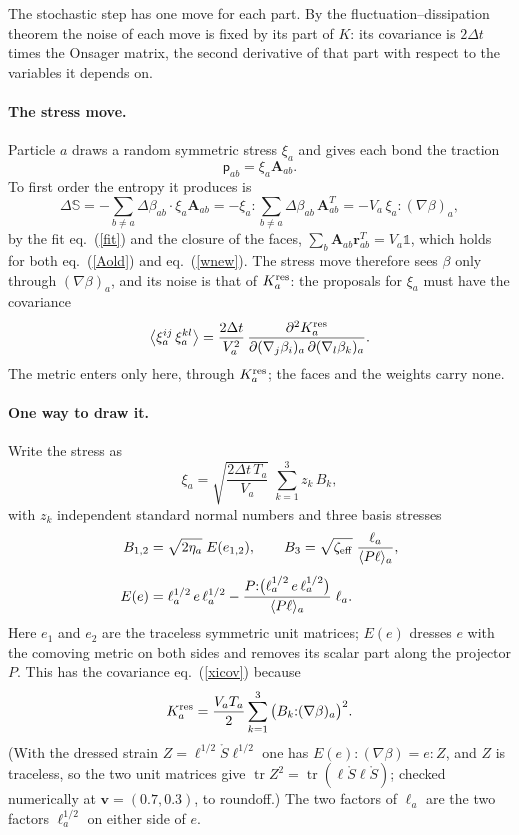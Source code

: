 \documentclass[11pt,aps,preprint,nofootinbib,superscriptaddress,tightenlines]{revtex4-2}
\newcommand{\one}{\mathds{1}}
\newcommand{\pf}{\bm{\mathsf p}}
\def\st{\begin{equation}}
\def\stp{\end{equation}}
\def\Eq#1{eq.~(\ref{#1})}
\def\tr{\operatorname{tr}}
\let\oldparagraph\paragraph
\renewcommand{\paragraph}{\par\bigskip\oldparagraph}
\begin{document}
The stochastic step has one move for each part.  By the fluctuation--dissipation theorem the noise of each move is fixed by its
part of $K$: its covariance is $2\Delta t$ times the Onsager matrix, the second derivative of that part with respect to the
variables it depends on.

\paragraph{The stress move.}  Particle $a$ draws a random symmetric stress $\xi_a$ and gives each bond the traction
\st
\pf_{ab}=\xi_a\bm A_{ab} .
\stp
To first order the entropy it produces is
\st
\Delta\mathbb S=-\sum_{b\neq a}\Delta\beta_{ab}\cdot\xi_a\bm A_{ab}
=-\xi_a{:}\sum_{b\neq a}\Delta\beta_{ab}\,\bm A_{ab}^T
=-V_a\,\xi_a{:}(\nabla\beta)_a ,
\label{dSstress}
\stp
by the fit \Eq{fit} and the closure of the faces, $\sum_b\bm A_{ab}\bm r_{ab}^T=V_a\one$, which holds for both \Eq{Aold} and \Eq{wnew}.  The
stress move therefore sees $\beta$ only through $(\nabla\beta)_a$, and its noise is that of $K_a^{\rm res}$: the proposals for $\xi_a$ must have
the covariance
\st
\big\langle\xi_a^{ij}\,\xi_a^{kl}\big\rangle=\frac{2\Delta t}{V_a^2}\,
\frac{\partial^2K_a^{\rm res}}{\partial(\nabla_j\beta_i)_a\,\partial(\nabla_l\beta_k)_a} .
\label{xicov}
\stp
The metric enters only here, through $K_a^{\rm res}$; the faces and the weights carry none.

\paragraph{One way to draw it.}  Write the stress as
\st
\xi_a=\sqrt{\frac{2\Delta t\,T_a}{V_a}}\;\sum_{k=1}^3z_k\,B_k ,
\label{B}
\stp
with $z_k$ independent standard normal numbers and three basis stresses
\st
\begin{aligned}
B_{1,2}&=\sqrt{2\eta_a}\;E(e_{1,2}),\qquad B_3=\sqrt{\zeta_{\rm eff}}\;\frac{\ell_a}{\langle P\ell\rangle_a},\\[4pt]
E(e)&=\ell_a^{1/2}\,e\,\ell_a^{1/2}-\frac{P{:}\big(\ell_a^{1/2}\,e\,\ell_a^{1/2}\big)}{\langle P\ell\rangle_a}\;\ell_a .
\end{aligned}
\stp
Here $e_1$ and $e_2$ are the traceless symmetric unit matrices; $E(e)$ dresses $e$ with the comoving metric on both sides and
removes its scalar part along the projector $P$.  This has the covariance \Eq{xicov} because
\st
K_a^{\rm res}=\frac{V_aT_a}{2}\sum_{k=1}^3\big(B_k{:}(\nabla\beta)_a\big)^2 .
\label{Kfromxi}
\stp
(With the dressed strain $Z=\ell^{1/2}\mathring S\ell^{1/2}$ one has $E(e){:}(\nabla\beta)=e{:}Z$, and $Z$ is traceless, so the two unit matrices
give $\tr Z^2=\tr(\ell\mathring S\ell\mathring S)$; checked numerically at $\bm v=(0.7,0.3)$, to roundoff.)  The two factors of $\ell_a$ are the two
factors $\ell_a^{1/2}$ on either side of $e$.
\end{document}
